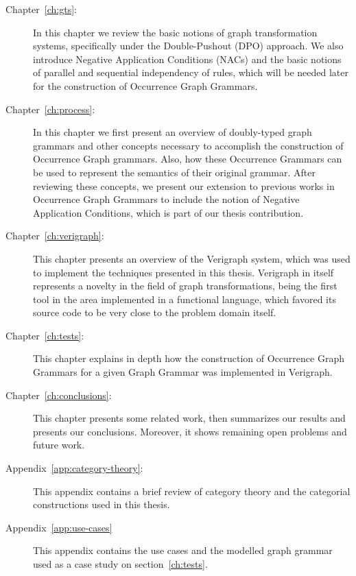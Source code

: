\begin{description}
	\item[Chapter~\ref{ch:gts}:] In this chapter we review the basic notions of graph transformation systems, specifically under the Double-Pushout (DPO) approach. We also introduce Negative Application Conditions (NACs) and the basic notions of parallel and sequential independency of rules, which will be needed later for the construction of Occurrence Graph Grammars.

  \item[Chapter~\ref{ch:process}:] In this chapter we first present an overview of doubly-typed graph grammars and other concepts necessary to accomplish the construction of Occurrence Graph grammars. Also, how these Occurrence Grammars can be used to represent the semantics of their original grammar. After reviewing these concepts, we present our extension to previous works in Occurrence Graph Grammars to include the notion of Negative Application Conditions, which is part of our thesis contribution.

  \item[Chapter~\ref{ch:verigraph}:] This chapter presents an overview of the Verigraph system, which was used to implement the techniques presented in this thesis. Verigraph in itself represents a novelty in the field of graph transformations, being the first tool in the area implemented in a functional language, which favored its source code to be very close to the problem domain itself.

  \item[Chapter~\ref{ch:tests}:] This chapter explains in depth how the construction of Occurrence Graph Grammars for a given Graph Grammar was implemented in Verigraph.%

  \item[Chapter~\ref{ch:conclusions}:] This chapter presents some related work, then summarizes our results and presents our conclusions. Moreover, it shows remaining open problems and future work.

  \item[Appendix~\ref{app:category-theory}:] This appendix contains a brief review of category theory and the categorial constructions used in this thesis.

  \item[Appendix~\ref{app:use-cases}] This appendix contains the use cases and the modelled graph grammar used as a case study on section~\ref{ch:tests}.
\end{description}
